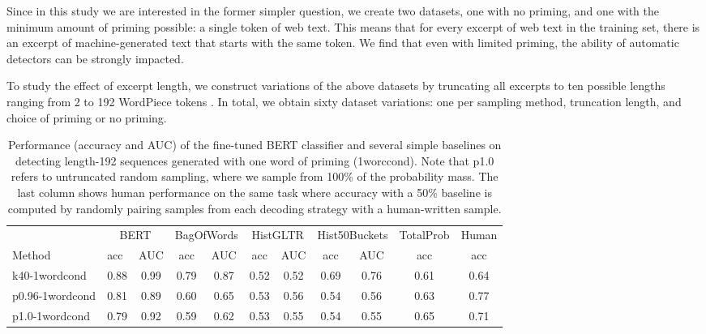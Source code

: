 Since in this study we are interested in the former simpler question, we create two datasets, one with no priming, and one with the minimum amount of priming possible: a single token of web text.
This means that for every excerpt of web text in the training set, there is an excerpt of machine-generated text that starts with the same token.
We find that even with limited priming, the ability of automatic detectors can be strongly impacted.

To study the effect of excerpt length, we construct variations of the above datasets by truncating all excerpts to ten possible lengths ranging from 2 to 192 WordPiece tokens \cite{wu2016google}. In total, we obtain sixty dataset variations: one per sampling method, truncation length, and choice of priming or no priming.


\begin{table}[t]
  \centering
  \small
    \begin{tabular}{|l||cc||cc|cc|cc|c||c|}
    \hline
          & \multicolumn{2}{c||}{BERT} & \multicolumn{2}{c|}{BagOfWords} & \multicolumn{2}{c|}{HistGLTR} & \multicolumn{2}{c|}{Hist50Buckets} & \multicolumn{1}{l||}{TotalProb} & \multicolumn{1}{l|}{Human} \\
    Method & \multicolumn{1}{l}{acc} & \multicolumn{1}{c||}{AUC} & \multicolumn{1}{c}{acc} & \multicolumn{1}{c|}{AUC} & \multicolumn{1}{c}{acc} & \multicolumn{1}{c|}{AUC} & \multicolumn{1}{c}{acc} & \multicolumn{1}{c|}{AUC} & \multicolumn{1}{c||}{acc} & \multicolumn{1}{c|}{acc}\\
    \hline
    k40-1wordcond & 0.88  & 0.99  & 0.79  & 0.87  & 0.52  & 0.52  & 0.69  & 0.76  & 0.61 & 0.64 \\
    p0.96-1wordcond & 0.81  & 0.89  & 0.60  & 0.65  & 0.53  & 0.56  & 0.54  & 0.56  & 0.63 & 0.77 \\
    p1.0-1wordcond & 0.79  & 0.92  & 0.59  & 0.62  & 0.53  & 0.55  & 0.54  & 0.55  & 0.65 & 0.71\\
    \hline
    \end{tabular}%
  \caption{Performance (accuracy and AUC) of the fine-tuned BERT classifier and several simple baselines on detecting length-192 sequences generated with one word of priming (1worccond). Note that p1.0 refers to untruncated random sampling, where we sample from 100\% of the probability mass. The last column shows human performance on the same task where accuracy with a 50\% baseline is computed by randomly pairing samples from each decoding strategy with a human-written sample.}
  \label{tab:baselines}%
\end{table}%

